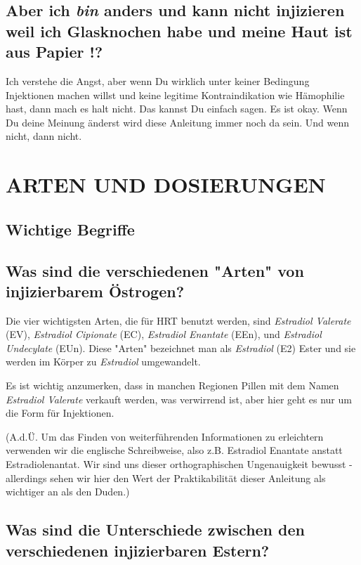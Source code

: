 \documentclass{article}
\begin{document}
{\subsection{Aber ich \textit{bin} anders und kann nicht injizieren weil ich Glasknochen habe und meine Haut ist aus Papier \textemdash{}!?}

Ich verstehe die Angst, aber wenn Du wirklich unter keiner Bedingung Injektionen machen willst und keine legitime Kontraindikation wie Hämophilie hast, dann mach es halt nicht. Das kannst Du einfach sagen. Es ist okay. Wenn Du deine Meinung änderst wird diese Anleitung immer noch da sein. Und wenn nicht, dann nicht. 

 

\section{ARTEN UND DOSIERUNGEN}\label{td}

\subsection*{Wichtige Begriffe}

\subsection{Was sind die verschiedenen "Arten" von injizierbarem Östrogen?}

Die vier wichtigsten Arten, die für HRT benutzt werden, sind \textit{Estradiol Valerate} (EV), \textit{Estradiol Cipionate} (EC), \textit{Estradiol Enantate} (EEn), und \textit{Estradiol Undecylate} (EUn). Diese "Arten" bezeichnet man als \textit{Estradiol} (E2) Ester und sie werden im Körper zu \textit{Estradiol} umgewandelt. 

Es ist wichtig anzumerken, dass in manchen Regionen Pillen mit dem Namen \textit{Estradiol Valerate} verkauft werden, was verwirrend ist, aber hier geht es nur um die Form für Injektionen.

(A.d.Ü. Um das Finden von weiterführenden Informationen zu erleichtern verwenden wir die englische Schreibweise, also z.B. Estradiol Enantate anstatt Estradiolenantat. Wir sind uns dieser orthographischen Ungenauigkeit bewusst - allerdings sehen wir hier den Wert der Praktikabilität dieser Anleitung als wichtiger an als den Duden.)

\subsection{Was sind die Unterschiede zwischen den verschiedenen injizierbaren Estern?}

}
\end{document}

